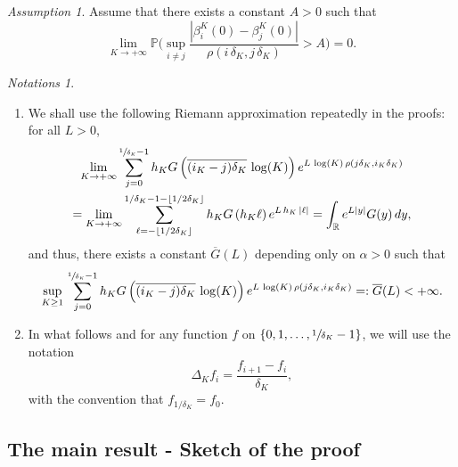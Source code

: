 \documentclass[JEP,XML,SOM,Unicode,published]{cedram}
\newenvironment{enumeratei}
{\bgroup\def\theenumi{\roman{enumi}}\def\theenumii{\arabic{enumii}}\begin{enumerate}}
{\end{enumerate}\egroup}
\theoremstyle{plain}
\theoremstyle{remark}
\newtheorem{hyp}[theorem]{Assumption}
\newtheorem*{notations}{Notations}
\begin{document}
\begin{hyp}\label{hypconvergence}
\noindent Assume that there exists a constant $A>0$ such that
\begin{equation*}%
\lim_{K\to+\infty}\mathbb{P}\Big(\sup_{i\neq j}\frac{|\beta^K_i(0)-\beta^K_j(0)|}{\rho(i\, \delta_K,j\, \delta_K)}> A\Big)=0.
\end{equation*}
\end{hyp}

\skpt
\begin{notations}
\begin{enumeratei}
\item
We shall use the following Riemann approximation repeatedly in the proofs: for all $L>0$,
\begin{multline*}%
\lim_{K\to +\infty}\sum_{j=0}^{\sfrac{1}{\delta_K}-1} h_K G\left(\overline{(i_K-j)\delta_K}\,\log(K)\right) e^{ L\,\log(K)\, \rho(j \delta_K,i_K \delta_K)}\\
=\lim_{K\to +\infty} \sum_{\ell=-\lfloor 1/2\delta_K\rfloor}^{1/\delta_K-1-\lfloor 1/2\delta_K\rfloor} h_K G\left(h_K\ell\right)e^{ L\,{h_K} \, | {\ell} |}
=\int_{\mathbb{R}}e^{L |y|}G(y)\,dy,
\end{multline*}
and thus, there exists a constant $\overline{G}(L)$ depending only on $\alpha>0$ such that 
\begin{equation}\label{eq:conv_moment-expo}
\sup_{K\geq 1}\,\sum_{j=0}^{\sfrac{1}{\delta_K}-1} h_K G\left(\overline{(i_K-j)\delta_K}\,\log(K)\right)e^{ L\,\log(K)\, \rho(j \delta_K,i_K \delta_K)} =: \overline G(L)<+\infty.
\end{equation}

\item
In what follows and for any function $f$ on $ \{0, 1,\dots, \sfrac{1}{\delta_K}-1\}$, we will use the notation
\[\Delta_Kf_i= \frac{f_{i+1}-f_i}{\delta_K},\]
with the convention that $f_{1/\delta_K}=f_0$.
\end{enumeratei}
\end{notations}

\subsection{The main result - Sketch of the proof}
\end{document}

